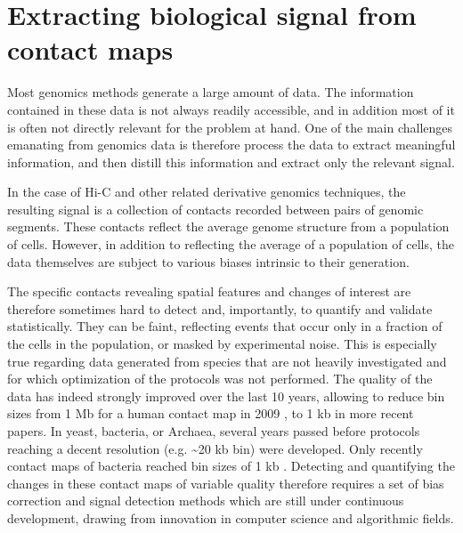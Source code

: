 
\chapter{Extracting biological signal from contact maps} %

\label{ch:02-01} %


Most genomics methods generate a large amount of data. The information contained in these data is not always readily accessible, and in addition most of it is often not directly relevant for the problem at hand. One of the main challenges emanating from genomics data is therefore process the data to extract meaningful information, and then distill this information and extract only the relevant signal.

In the case of Hi-C and other related derivative genomics techniques, the resulting signal is a collection of contacts recorded between pairs of genomic segments. These contacts reflect the average genome structure from a population of cells. However, in addition to reflecting the average of a population of cells, the data themselves are subject to various biases intrinsic to their generation.

The specific contacts revealing spatial features and changes of interest are therefore sometimes hard to detect and, importantly, to quantify and validate statistically. They can be faint, reflecting events that occur only in a fraction of the cells in the population, or masked by experimental noise. This is especially true regarding data generated from species that are not heavily investigated and for which optimization of the protocols was not performed. The quality of the data has indeed strongly improved over the last 10 years, allowing to reduce bin sizes from 1 Mb for a human contact map in 2009 \cite{lieberman-aidenComprehensiveMappingLongRange2009}, to 1 kb in more recent papers. In yeast, bacteria, or Archaea, several years passed before protocols reaching a decent resolution (e.g. \textasciitilde 20 kb bin) were developed. Only recently contact maps of bacteria reached bin sizes of 1 kb \cite{cockramGenerationGenelevelResolution2021}. Detecting and quantifying the changes in these contact maps of variable quality therefore requires a set of bias correction and signal detection methods which are still under continuous development, drawing from innovation in computer science and algorithmic fields. 

